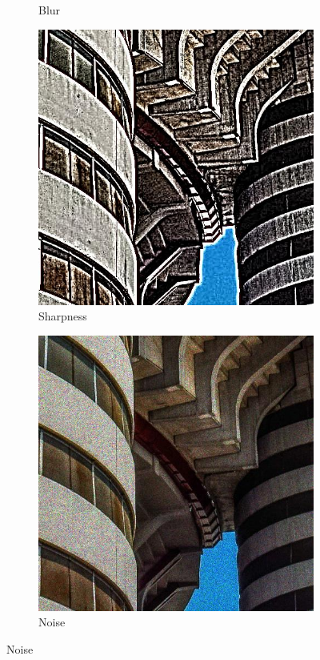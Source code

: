 \begin{figure}[ht]
\begin{subfigure}[b]{0.24\textwidth}
        \caption{Blur}
        \label{fig:blur}
    \end{subfigure}
    \hfill
    \begin{subfigure}[b]{0.24\textwidth}
        \includegraphics[width=\textwidth]{img/Sharpness.jpg}
        \caption{Sharpness}
        \label{fig:sharpness}
    \end{subfigure}
    \hfill
    \begin{subfigure}[b]{0.24\textwidth}
        \includegraphics[width=\textwidth]{img/Noise.jpg}
        \caption{Noise}
        \label{fig:noise}
    \end{subfigure} 


\end{figure}
